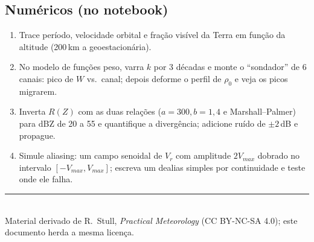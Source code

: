 \documentclass[11pt]{article}
\begin{document}
\subsection*{Numéricos (no notebook)}

\begin{enumerate}[label=\textbf{N\arabic*.},itemsep=4pt]
  \item Trace período, velocidade orbital e fração visível da Terra em
        função da altitude (200\,km a geoestacionária).
  \item No modelo de funções peso, varra $k$ por 3 décadas e monte o
        ``sondador'' de 6 canais: pico de $W$ vs.\ canal; depois deforme
        o perfil de $\rho_0$ e veja os picos migrarem.
  \item Inverta $R(Z)$ com as duas relações ($a{=}300,b{=}1{,}4$ e
        Marshall--Palmer) para dBZ de 20 a 55 e quantifique a
        divergência; adicione ruído de $\pm2$\,dB e propague.
  \item Simule aliasing: um campo senoidal de $V_r$ com amplitude
        $2V_{max}$ dobrado no intervalo $[-V_{max}, V_{max}]$; escreva
        um dealias simples por continuidade e teste onde ele falha.
\end{enumerate}

\vspace{1em}
\noindent\rule{\linewidth}{0.4pt}\\
{\scriptsize Material derivado de R.~Stull, \emph{Practical Meteorology}
(CC BY-NC-SA 4.0); este documento herda a mesma licença.}
\end{document}
